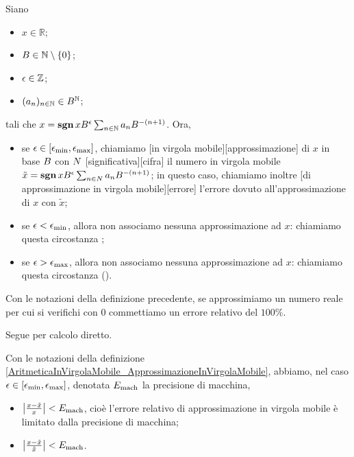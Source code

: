 \begin{Definition}
	\label{AritmeticaInVirgolaMobile_ApprossimazioneInVirgolaMobile}
	Siano
	\begin{itemize}
		\item $x \in \mathbb{R}$;
		\item $B \in \mathbb{N} \setminus \lbrace 0 \rbrace$;
		\item $\epsilon \in \mathbb{Z}$;
		\item $(a_n)_{n \in \mathbb{N}} \in B^\mathbb{N}$;
	\end{itemize}
	tali che $x = \operatorname{\textbf{sgn}}{x} B^\epsilon \sum_{n \in \mathbb{N}} a_n B^{- (n + 1)}$. Ora,
	\begin{itemize}
		\item se $\epsilon \in [\epsilon_{\min},\epsilon_{\max}]$, chiamiamo [in virgola mobile][approssimazione] di $x$ in base $B$ con $N$ [significativa][cifra] il numero in virgola mobile $\tilde{x} = \operatorname{\textbf{sgn}}{x} B^\epsilon \sum_{n \in N} a_n B^{- (n + 1)}$; in questo caso, chiamiamo inoltre [di approssimazione in virgola mobile][errore] l'errore dovuto all'approssimazione di $x$ con $\tilde{x}$;
		\item se $\epsilon < \epsilon_{\min}$, allora non associamo nessuna approssimazione ad $x$: chiamiamo questa circostanza ;
		\item se $\epsilon > \epsilon_{\max}$, allora non associamo nessuna approssimazione ad $x$: chiamiamo questa circostanza  ().
	\end{itemize}
\end{Definition}
\begin{Theorem}
	Con le notazioni della definizione precedente, se approssimiamo un numero reale per cui si verifichi  con $0$ commettiamo un errore relativo del $100\%$.
\end{Theorem}
\Proof Segue per calcolo diretto. \EndProof
\begin{Theorem}
	Con le notazioni della definizione \ref{AritmeticaInVirgolaMobile_ApprossimazioneInVirgolaMobile}, abbiamo, nel caso $\epsilon \in [\epsilon_{\min},\epsilon_{\max}]$, denotata $E_{\text{mach}}$ la precisione di macchina,
	\begin{itemize}
		\item $\left \lvert \frac{x - \tilde{x}}{x} \right \rvert < E_{\text{mach}}$, cio\`e l'errore relativo di approssimazione in virgola mobile \`e limitato dalla precisione di macchina;
		\item $\left \lvert \frac{x - \tilde{x}}{\tilde{x}} \right \rvert < E_{\text{mach}}$.
	\end{itemize}
\end{Theorem}
